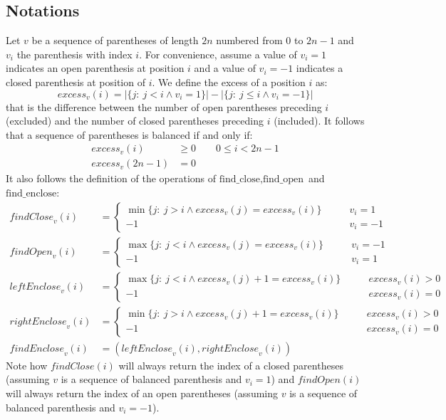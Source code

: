 \documentclass{article}
\begin{document}
\subsection{Notations}
Let $v$ be a sequence of parentheses of length $2n$ numbered from $0$ to $2n-1$ and $v_i$ the parenthesis with index $i$. For convenience, assume a value of $v_i=1$ indicates an open parenthesis at position $i$ and a value of $v_i=-1$ indicates a closed parenthesis at position of $i$. We define the excess of a position $i$ as:
    $$
    \mathit{excess}_v(i) = |\{j :\ j<i \land v_i=1\}|-|\{j :\ j\leq i \land v_i=-1\}|
    $$
that is the difference between the number of open parentheses preceding $i$ (excluded) and the number of closed parentheses preceding $i$ (included).
It follows that a sequence of parentheses is balanced if and only if:
    \begin{align*}
    \mathit{excess}_v(i) &\geq 0 \qquad 0\leq i < 2n-1 \\
    \mathit{excess}_v(2n-1) &= 0
    \end{align*}
It also follows the definition of the operations of $\text{find\_close}, \text{find\_open}$ and $\text{find\_enclose}$:
    \begin{align*}
    \mathit{findClose}_v(i) &= 
        \begin{cases}
            \min\{j :\ j>i \land \mathit{excess}_v(j)=\mathit{excess}_v(i)\} \qquad &v_i = 1 \\
            -1 \qquad &v_i = -1
        \end{cases} \\
    \mathit{findOpen}_v(i) &= 
        \begin{cases}
            \max\{j :\ j<i \land \mathit{excess}_v(j)=\mathit{excess}_v(i)\} \qquad &v_i = -1 \\
            -1 \qquad &v_i = 1
        \end{cases}\\
    \mathit{leftEnclose}_v(i) &= 
        \begin{cases}
        \max\{j :\ j<i \land \mathit{excess}_v(j)+1=\mathit{excess}_v(i)\} \qquad &\mathit{excess}_v(i) > 0 \\
        -1 \qquad &\mathit{excess}_v(i) = 0
        \end{cases}\\
    \mathit{rightEnclose}_v(i) &=
    \begin{cases}
    \min\{j :\ j>i \land \mathit{excess}_v(j)+1=\mathit{excess}_v(i)\} \qquad &\mathit{excess}_v(i) > 0 \\
    -1 \qquad & \mathit{excess}_v(i) = 0
    \end{cases}\\
    \mathit{findEnclose}_v(i) &= (\mathit{leftEnclose}_v(i),\mathit{rightEnclose}_v(i))
    \end{align*}
Note how $\mathit{findClose}(i)$ will always return the index of a closed parentheses (assuming $v$ is a sequence of balanced parenthesis and $v_i=1$) and $\mathit{findOpen}(i)$ will always return the index of an open parentheses (assuming $v$ is a sequence of balanced parenthesis and $v_i=-1$).
\end{document}
